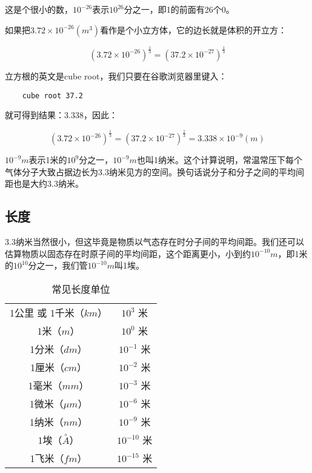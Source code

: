这是个很小的数，$10^{-26}$表示$10^{26}$分之一，即1的前面有26个0。

如果把$3.72 \times 10^{-26} (m^3)$看作是个小立方体，它的边长就是体积的开立方：

\begin{equation*}
( 3.72 \times 10^{-26} )^{\frac{1}{3}} = (37.2 \times 10^{-27})^{\frac{1}{3}}
\end{equation*}

立方根的英文是cube root，我们只要在谷歌浏览器里键入：

\begin{verbatim}
    cube root 37.2
\end{verbatim}


就可得到结果：3.338，因此：

\begin{equation*}
( 3.72 \times 10^{-26} )^{\frac{1}{3}} = (37.2 \times 10^{-27})^{\frac{1}{3}} = 3.338 \times 10^{-9} (m)
\end{equation*}

$10^{-9} m$表示1米的$10^9$分之一，$10^{-9} m$也叫1纳米。这个计算说明，常温常压下每个气体分子大致占据边长为3.3纳米见方的空间。换句话说分子和分子之间的平均间距也是大约3.3纳米。

\subsection{长度}

3.3纳米当然很小，但这毕竟是物质以气态存在时分子间的平均间距。我们还可以估算物质以固态存在时原子间的平均间距，这个距离更小，小到约$10^{-10} m$，即1米的$10^{10}$分之一，我们管$10^{-10} m$叫1埃。

\begin{table}[htdp]
\caption{常见长度单位}
\begin{center}
\begin{tabular}{|c|c|}
\hline
1公里 或 1千米（$km$） & $10^3$ 米 \\
1米（$m$） & $10^0$ 米 \\
1分米（$dm$） & $10^{-1}$ 米 \\
1厘米（$cm$） & $10^{-2}$ 米 \\
1毫米（$mm$） & $10^{-3}$ 米 \\
1微米（$\mu m$） & $10^{-6}$ 米 \\
1纳米（$nm$） & $10^{-9}$ 米 \\
1埃（$\overset{\circ}{A}$） & $10^{-10}$ 米 \\
1飞米（$fm$） & $10^{-15}$ 米 \\
\hline
\end{tabular}
\end{center}
\label{default}
\end{table}%

